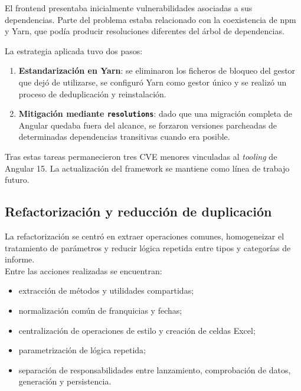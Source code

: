 \documentclass[11pt,a4paper,titlepage,oneside]{report}
\begin{document}
El frontend presentaba inicialmente vulnerabilidades asociadas a sus
dependencias. Parte del problema estaba relacionado con la coexistencia de npm
y Yarn, que podía producir resoluciones diferentes del árbol de dependencias.

La estrategia aplicada tuvo dos pasos:

\begin{enumerate}

  \item \textbf{Estandarización en Yarn}: se eliminaron los ficheros de bloqueo
  del gestor que dejó de utilizarse, se configuró Yarn como gestor único y se
  realizó un proceso de deduplicación y reinstalación.

  \item \textbf{Mitigación mediante \texttt{resolutions}}: dado que una
  migración completa de Angular quedaba fuera del alcance, se forzaron
  versiones parcheadas de determinadas dependencias transitivas cuando era
  posible.

\end{enumerate}

Tras estas tareas permanecieron tres CVE menores vinculadas al
\textit{tooling} de Angular 15. La actualización del framework se mantiene como
línea de trabajo futuro.

\subsection{Refactorización y reducción de duplicación}

La refactorización se centró en extraer operaciones comunes, homogeneizar el
tratamiento de parámetros y reducir lógica repetida entre tipos y categorías
de informe.\\

Entre las acciones realizadas se encuentran:

\begin{itemize}
  \item extracción de métodos y utilidades compartidas;
  \item normalización común de franquicias y fechas;
  \item centralización de operaciones de estilo y creación de celdas Excel;
  \item parametrización de lógica repetida;
  \item separación de responsabilidades entre lanzamiento, comprobación de
  datos, generación y persistencia.
\end{itemize}
\end{document}
